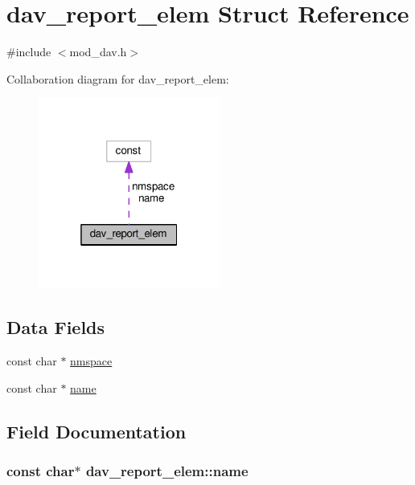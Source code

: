 \hypertarget{structdav__report__elem}{}\section{dav\+\_\+report\+\_\+elem Struct Reference}
\label{structdav__report__elem}


{\ttfamily \#include $<$mod\+\_\+dav.\+h$>$}



Collaboration diagram for dav\+\_\+report\+\_\+elem\+:
\nopagebreak
\begin{figure}[H]
\begin{center}
\leavevmode
\includegraphics[width=169pt]{structdav__report__elem__coll__graph}
\end{center}
\end{figure}
\subsection*{Data Fields}
\begin{DoxyCompactItemize}
\item 
const char $\ast$ \hyperlink{structdav__report__elem_a247f168bde74d84030471e0d6ff25a06}{nmspace}
\item 
const char $\ast$ \hyperlink{structdav__report__elem_a520c920e5fcdf4006a33660aea477669}{name}
\end{DoxyCompactItemize}


\subsection{Field Documentation}
\subsubsection[{\texorpdfstring{name}{name}}]{\setlength{\rightskip}{0pt plus 5cm}const char$\ast$ dav\+\_\+report\+\_\+elem\+::name}\hypertarget{structdav__report__elem_a520c920e5fcdf4006a33660aea477669}{}\label{structdav__report__elem_a520c920e5fcdf4006a33660aea477669}
